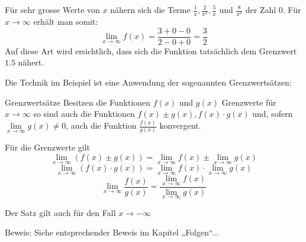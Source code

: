 Für sehr grosse Werte von $x$ nähern sich die Terme $\frac{1}{x}, \frac{2}{x^2}, \frac{5}{x}$ und $\frac{8}{x^2}$  der Zahl $0$. Für $x\rightarrow\infty$ erhält man somit:
$$\lim_{x\rightarrow\infty} f(x) = \frac{3+0-0}{2-0+0} = \frac{3}{2}$$
Auf diese Art wird ersichtlich, dass sich die Funktion tatsächlich dem Grenzwert $1.5$ nähert.

Die Technik im Beispiel ist eine Anwendung der sogenannten Grenzwertsätzen:
 
\begin{satz}
    {Grenzwertsätze}{}
    Besitzen die Funktionen $f(x)$ und $g(x)$ Grenzwerte  für $x\rightarrow\infty$ so sind auch die Funktionen $f(x)\pm g(x),f(x)\cdot g(x)$ und, sofern $\lim\limits_{x\rightarrow\infty} g(x)\neq 0$, auch die Funktion $\frac{f(x)}{g(x)}$ konvergent.

Für die Grenzwerte gilt
$$\lim_{x\rightarrow\infty} (f(x) \pm g(x)) = \lim_{x\rightarrow\infty} f(x) \pm \lim_{x\rightarrow\infty}g(x)$$
$$\lim_{x\rightarrow\infty} (f(x) \cdot g(x)) = \lim_{x\rightarrow\infty} f(x) \cdot \lim_{x\rightarrow\infty}g(x)$$
$$\lim_{x\rightarrow\infty} \frac{f(x)}{g(x)} = \frac{\lim_{x\rightarrow\infty} f(x)}{\lim_{x\rightarrow\infty}g(x)}$$

Der Satz gilt auch für den Fall $x\rightarrow-\infty$
\end{satz}
Beweis: Siehe entsprechender Beweis im Kapitel „Folgen“...
